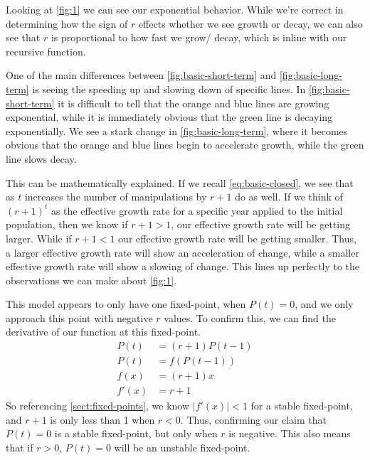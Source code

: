 \documentclass{article}
\begin{document}


Looking at \cref{fig:1} we can see our exponential behavior. While we're correct in determining how the sign of $r$ effects whether we see growth or decay, we can also see that $r$ is proportional to how fast we grow/ decay, which is inline with our recursive function.

One of the main differences between \cref{fig:basic-short-term} and \cref{fig:basic-long-term} is seeing the speeding up and slowing down of specific lines. In \cref{fig:basic-short-term} it is difficult to tell that the orange and blue lines are growing exponential, while it is immediately obvious that the green line is decaying exponentially. We see a stark change in \cref{fig:basic-long-term}, where it becomes obvious that the orange and blue lines begin to accelerate growth, while the green line slows decay.

This can be mathematically explained. If we recall \cref{eq:basic-closed}, we see that as $t$ increases the number of manipulations by $r + 1$ do as well. If we think of $(r+1)^t$ as the effective growth rate for a specific year applied to the initial population, then we know if $r + 1 > 1$, our effective growth rate will be getting larger. While if $r + 1 < 1$ our effective growth rate will be getting smaller. Thus, a larger effective growth rate will show an acceleration of change, while a smaller effective growth rate will show a slowing of change. This lines up perfectly to the observations we can make about \cref{fig:1}.

This model appears to only have one fixed-point, when $P(t) = 0$, and we only approach this point with negative $r$ values. To confirm this, we can find the derivative of our function at this fixed-point.
\begin{align*}
    P(t) &= (r+1)P(t-1) \\
    P(t) &= f(P(t-1)) \\
    f(x) &= (r+1)x \\
    f'(x) &= r+1
\end{align*}
So referencing \cref{sect:fixed-points}, we know $|f'(x)| < 1$ for a stable fixed-point, and $r+1$ is only less than 1 when $r < 0$. Thus, confirming our claim that $P(t) = 0$ is a stable fixed-point, but only when $r$ is negative. This also means that if $r > 0$, $P(t) = 0$ will be an unstable fixed-point.
\end{document}
